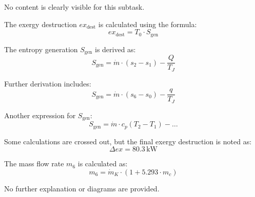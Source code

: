 No content is clearly visible for this subtask.

The exergy destruction \( ex_{\text{dest}} \) is calculated using the formula:  
\[
ex_{\text{dest}} = T_0 \cdot S_{\text{gen}}
\]  

The entropy generation \( S_{\text{gen}} \) is derived as:  
\[
S_{\text{gen}} = \dot{m} \cdot (s_2 - s_1) - \frac{Q}{T_J}
\]  

Further derivation includes:  
\[
S_{\text{gen}} = \dot{m} \cdot (s_6 - s_0) - \frac{q}{T_J}
\]  

Another expression for \( S_{\text{gen}} \):  
\[
S_{\text{gen}} = \dot{m} \cdot c_p(T_2 - T_1) - \dots
\]  

Some calculations are crossed out, but the final exergy destruction is noted as:  
\[
\Delta ex = 80.3 \, \text{kW}
\]  

The mass flow rate \( m_6 \) is calculated as:  
\[
m_6 = \dot{m}_K \cdot (1 + 5.293 \cdot m_c)
\]  

No further explanation or diagrams are provided.